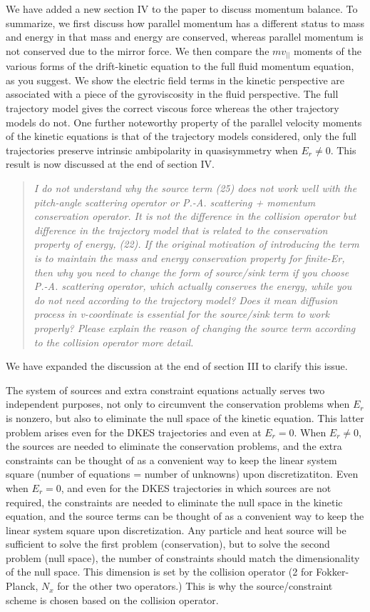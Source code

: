 \documentclass[11pt]{article}
\newenvironment{referee}{\begin{quote}\it\color{Blue}}{\end{quote}}
\begin{document}
We have added a new section IV to the paper to discuss momentum balance.
To summarize, we first discuss how parallel momentum has a different status to mass and energy in that mass and
energy are conserved, whereas parallel momentum is not conserved due to the mirror force.
We then compare the $m v_{||}$ moments of the various forms of the drift-kinetic
equation to the full fluid momentum equation, as you suggest.
We show the electric field terms in the kinetic perspective
are associated with a piece of the gyroviscosity in the fluid perspective.  The full trajectory model
gives the correct viscous force whereas the other trajectory models do not.
One further noteworthy property of the parallel velocity moments of the kinetic equations
is that of the trajectory models considered, only the full trajectories preserve intrinsic
ambipolarity in quasisymmetry when $E_r \ne 0$. This result is now discussed at the end of section IV.

\begin{referee}
I do not understand why the source term (25) does not work well with the pitch-angle scattering
operator or P.-A. scattering + momentum conservation operator. It is not the difference in the
collision operator but difference in the trajectory model that is related to the conservation
property of energy, (22). If the original motivation of introducing the term is to maintain the
mass and energy conservation property for finite-Er, then why you need to change the form of
source/sink term if you choose P.-A. scattering operator, which actually conserves the energy,
while you do not need according to the trajectory model? Does it mean diffusion process in
v-coordinate is essential for the source/sink term to work properly?
Please explain the reason of changing the source term according to the collision operator more
detail.
\end{referee}

We have expanded the discussion at the end of section III to clarify this issue.

The system of sources and extra constraint equations actually serves two independent purposes,
not only to circumvent the conservation problems when $E_r$ is nonzero, but also to eliminate the null
space of the kinetic equation. This latter problem arises even for the DKES trajectories 
and even at $E_r=0$.  
When $E_r \ne 0$, the sources are needed to eliminate the conservation problems, and the extra constraints 
can be thought of as a convenient way to keep the linear system square (number of equations = number of unknowns) upon discretizatiton.
Even when $E_r = 0$, and even for the DKES trajectories in which sources are not required, the constraints are needed to eliminate
the null space in the kinetic equation, and the source terms can be thought of as
a convenient way to keep the linear system square upon discretization.
Any particle and heat source will be sufficient to solve the first problem (conservation), but to solve the second problem (null space),
the number of constraints should match the dimensionality of the null space.  This dimension is set by the collision operator (2 for
Fokker-Planck, $N_x$ for the other two operators.)
This is why the source/constraint scheme is chosen based on the collision operator.
\end{document}
